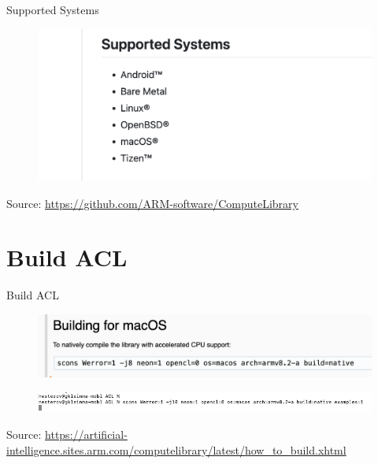 \documentclass{beamer}
\begin{document}
\begin{frame}{Supported Systems}
  \begin{figure}[h]
    \includegraphics[width=1\textwidth]{images/os.png}
  \end{figure}
  \footnotesize Source: \href{https://github.com/ARM-software/ComputeLibrary}{https://github.com/ARM-software/ComputeLibrary}
\end{frame}

\section{Build ACL}
\begin{frame}{Build ACL}
  \begin{figure}[h]
    \includegraphics[width=1\textwidth]{images/build_macos.png}
  \end{figure}
  \begin{figure}[h]
    \includegraphics[width=1\textwidth]{images/exmpl.png}
  \end{figure}
  \footnotesize Source: \href{https://artificial-intelligence.sites.arm.com/computelibrary/latest/how_to_build.xhtml}{https://artificial-intelligence.sites.arm.com/computelibrary/latest/how\_to\_build.xhtml}
\end{frame}
\end{document}
